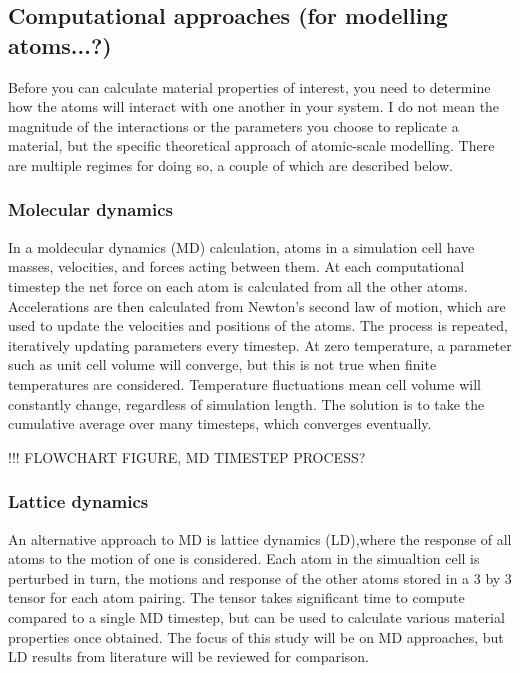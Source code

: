 \subsection{Computational approaches (for modelling atoms...?)}

Before you can calculate material properties of interest, you need to determine how the atoms will interact with one another in your system. I do not mean the magnitude of the interactions or the parameters you choose to replicate a material, but the specific theoretical approach of atomic-scale modelling. There are multiple regimes for doing so, a couple of which are described below.

\subsubsection{Molecular dynamics}

In a moldecular dynamics (MD) calculation, atoms in a simulation cell have masses, velocities, and forces acting between them. At each computational timestep the net force on each atom is calculated from all the other atoms. Accelerations are then calculated from Newton's second law of motion, which are used to update the velocities and positions of the atoms. The process is repeated, iteratively updating parameters every timestep. At zero temperature, a parameter such as unit cell volume will converge, but this is not true when finite temperatures are considered. Temperature fluctuations mean cell volume will constantly change, regardless of simulation length. The solution is to take the cumulative average over many timesteps, which converges eventually.

!!! FLOWCHART FIGURE, MD TIMESTEP PROCESS?

\subsubsection{Lattice dynamics}

An alternative approach to MD is lattice dynamics (LD),where the response of all atoms to the motion of one is considered. Each atom in the simualtion cell is perturbed in turn, the motions and response of the other atoms stored  in a 3 by 3 tensor for each atom pairing. The tensor takes significant time to compute compared to a single MD timestep, but can be used to calculate various material properties once obtained. The focus of this study will be on MD approaches, but LD results from literature will be reviewed for comparison.

